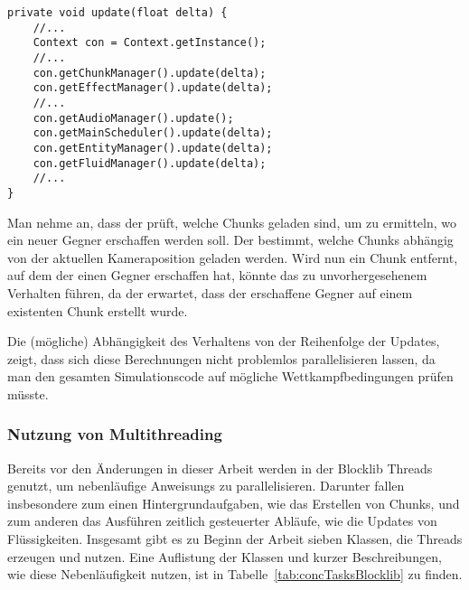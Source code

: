 \begin{lstlisting}[caption={Vereinfachte Update-Methode von \classGame{}.}, label={lst:gameUpdate},float={htbp}]
private void update(float delta) {
	//...
	Context con = Context.getInstance();
	//...
	con.getChunkManager().update(delta);
	con.getEffectManager().update(delta);
	//...
	con.getAudioManager().update();
	con.getMainScheduler().update(delta);
	con.getEntityManager().update(delta);
	con.getFluidManager().update(delta);
	//...
}
\end{lstlisting}

\begin{example}
Man nehme an, dass der \classEntityManager{} prüft, welche Chunks geladen sind, um zu ermitteln, wo ein neuer Gegner erschaffen werden soll.
Der \classChunkManager{} bestimmt, welche Chunks abhängig von der aktuellen Kameraposition geladen werden.
Wird nun ein Chunk entfernt, auf dem der \classEntityManager{} einen Gegner erschaffen hat, könnte das zu unvorhergesehenem Verhalten führen, da der \classEntityManager{} erwartet, dass der erschaffene Gegner auf einem existenten Chunk erstellt wurde.
\end{example}

Die (mögliche) Abhängigkeit des Verhaltens von der Reihenfolge der Updates, zeigt, dass sich diese Berechnungen nicht problemlos parallelisieren lassen, da man den gesamten Simulationscode auf mögliche Wettkampfbedingungen prüfen müsste.


\subsubsection{Nutzung von Multithreading}\label{sec:nutzungMultithreading}
Bereits vor den Änderungen in dieser Arbeit werden in der Blocklib Threads genutzt, um nebenläufige \glspl{Anweisung} zu parallelisieren. Darunter fallen insbesondere zum einen Hintergrundaufgaben, wie das Erstellen von Chunks, und zum anderen das Ausführen zeitlich gesteuerter Abläufe, wie die Updates von Flüssigkeiten. Insgesamt gibt es zu Beginn der Arbeit sieben Klassen, die Threads erzeugen und nutzen. Eine Auflistung der Klassen und kurzer Beschreibungen, wie diese Nebenläufigkeit nutzen, ist in Tabelle~\ref{tab:concTasksBlocklib} zu finden.

